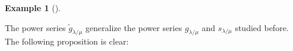 \documentclass[numbers=enddot,12pt,final,onecolumn,notitlepage]{scrartcl}%
\theoremstyle{definition}
\newtheorem{exmp}[theo]{Example}
\newenvironment{example}[1][]
{\begin{exmp}[#1]\begin{leftbar}}
{\end{leftbar}\end{exmp}}
\let\sumnonlimits\sum
\renewcommand{\sum}{\sumnonlimits\limits}
\begin{document}
\begin{example}
\begin{comment}
\textbf{(c)} Let now $n=3$, let $\lambda=\left(  2,1\right)  $ and let
$\mu=\varnothing$. Then, the rpps $T$ of shape $Y\left(  \lambda/\mu\right)  $
have the form $%
\ytableausetup{notabloids}
\begin{ytableau}
a & b \\
c
\end{ytableau}%
$ with $a\leq b$ and $a\leq c$. Each such rpp $T$ satisfies $\mathbf{t}%
^{\operatorname*{ceq}\left(  T\right)  }=\left\{
\begin{array}
[c]{c}%
1,\text{ if }a<c;\\
t_{1},\text{ if }a=c
\end{array}
\right.  $ and $\mathbf{x}^{\operatorname*{ircont}\left(  T\right)  }=\left\{
%
\begin{array}
[c]{c}%
x_{a}x_{b}x_{c},\ \text{if }a<c;\\
x_{a}x_{b},\ \text{if }a=c
\end{array}
\right.  $. Thus,%
\begin{align*}
\widetilde{g}_{\lambda/\mu}  &  =\sum_{\substack{T\text{ is an rpp}\\\text{of
shape }Y\left(  \lambda/\mu\right)  }}\mathbf{t}^{\operatorname*{ceq}\left(
T\right)  }\mathbf{x}^{\operatorname*{ircont}\left(  T\right)  }=\sum_{a\leq
b;\ a\leq c}\left\{
\begin{array}
[c]{c}%
1,\text{ if }a<c;\\
t_{1},\text{ if }a=c
\end{array}
\right.  \left\{
\begin{array}
[c]{c}%
x_{a}x_{b}x_{c},\ \text{if }a<c;\\
x_{a}x_{b},\ \text{if }a=c
\end{array}
\right. \\
&  =\sum_{a\leq b;\ a<c}x_{a}x_{b}x_{c}+t_{1}\sum_{a\leq b}x_{a}x_{b}.
\end{align*}

\end{comment}


\end{example}

The power series $\widetilde{g}_{\lambda/\mu}$ generalize the power series
$g_{\lambda/\mu}$ and $s_{\lambda/\mu}$ studied before. The following proposition is clear:
\end{document}
